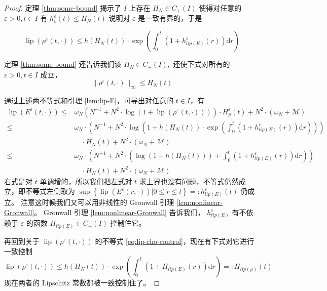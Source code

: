 \begin{proof}
定理 \ref{thm:some-bound} 揭示了 $I$ 上存在 $H_N \in C_{+}(I)$ 使得对任意的 $\varepsilon>0, t \in I$ 有 $h_{v}^{\varepsilon}(t) \leqslant H_{N}(t) $ 说明对 $\varepsilon$ 是一致有界的，于是

\begin{equation}
    \label{eq:lip-rho-control}
    \operatorname{lip}\left(\rho^{\varepsilon}(t, \cdot)\right) \leqslant h\left(H_{N}(t)\right) \cdot \exp \left(\int_{0}^{t}\left(1+h^{\varepsilon}_{lip(E)}(r)\right) \mathrm{d} r\right)
\end{equation}

定理 \ref{thm:some-bound} 还告诉我们该 $H_{N} \in C_{+}(I),$ 还使下式对所有的  $\varepsilon>0, t \in I$ 成立，
\begin{equation}
    \|\rho^{\varepsilon}(t, \cdot)\|_{\infty} \leqslant H_{N}(t)
\end{equation}

通过上述两不等式和引理 \ref{lem:lip-E}，可导出对任意的 $t \in I$，有
\[
\begin{aligned}
\operatorname{lip}\left(E^{\varepsilon}(t, \cdot)\right) \leqslant & \omega_{N}\left(N^{-1}+N^{2} \cdot \log \left(1+\operatorname{lip}\left(\rho^{\varepsilon}(t, \cdot)\right)\right)\right) \cdot H_{\rho}^{\varepsilon}(t) +N^{2} \cdot\left(\omega_{N}+\mathcal{M}\right) \\
\leqslant & \omega_{N} \cdot\left(N^{-1}+N^{2} \cdot \log \left(1+h\left(H_{N}(t)\right)\cdot \exp \left(\int_{0}^{t}\left(1+h^{\varepsilon}_{lip(E)}(r)\right) \mathrm{d} r\right)\right)\right)\\
& \quad \cdot H_{N}(t)+N^{2} \cdot\left(\omega_{N}+\mathcal{M}\right) \\
\leqslant & \omega_{N} \cdot\left(N^{-1}+N^{2} \cdot\left(\log \left(1+h\left(H_{N}(t)\right)\right) +\int_{0}^{t}\left(1+h^{\varepsilon}_{lip(E)}(r)\right) \mathrm{d} r\right)\right)\\
&\quad \cdot H_{N}(t)+N^{2} \cdot\left(\omega_{N}+\mathcal{M}\right)
\end{aligned}
\]
右式是对 $t$ 单调增的，所以我们把左式对 $t$ 求上界也没有问题，不等式仍然成立，即不等式左侧取为 $\sup \left\{\operatorname{lip}\left(E^{\varepsilon}(r, \cdot)\right) | 0 \leqslant r \leqslant t\right\}=:h^{\varepsilon}_{lip(E)}(t)$ 仍成立。 注意这时候我们又可以用非线性的 Gronwall 引理 \ref{lem:nonlinear-Gronwall}。 Gronwall 引理 \ref{lem:nonlinear-Gronwall} 告诉我们， $h^{\varepsilon}_{lip(E)}$ 有不依赖于 $\varepsilon$ 的函数 $H_{lip(E)}\in C_+(I)$ 控制住它。 

再回到关于 $\operatorname{lip}\left(\rho^{\varepsilon}(t, \cdot)\right) $ 的不等式 \ref{eq:lip-rho-control}，现在有下式对它进行一致控制 
\[
\operatorname{lip}\left(\rho^{\varepsilon}(t, \cdot)\right) \leqslant h\left(H_N(t)\right) \cdot \exp \left(\int_{0}^{t}\left(1+H_{lip(E)}(r)\right) \mathrm{d} r\right)=: H_{lip(\rho)}(t)
\]
现在两者的 Lipschitz 常数都被一致控制住了。



\end{proof}
